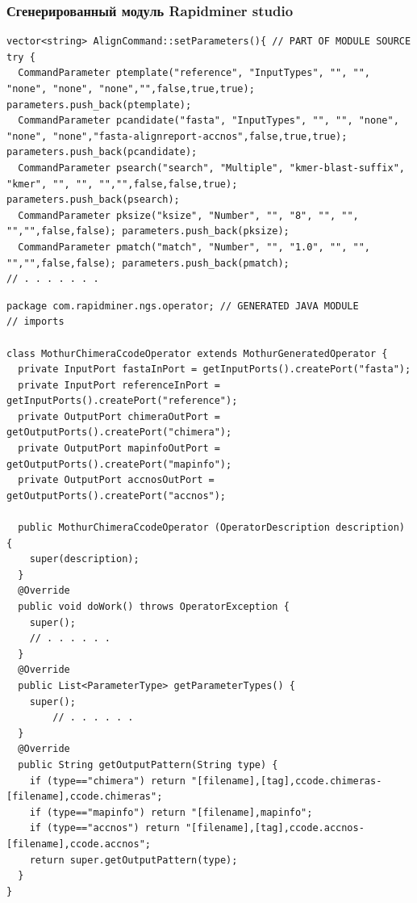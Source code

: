 \documentclass[10pt]{beamer}
\begin{document}
\begin{frame}[fragile]
  \frametitle{Сгенерированный модуль Rapidminer studio}
\begin{verbatim}
vector<string> AlignCommand::setParameters(){ // PART OF MODULE SOURCE
try {
  CommandParameter ptemplate("reference", "InputTypes", "", "", "none", "none", "none","",false,true,true); parameters.push_back(ptemplate);
  CommandParameter pcandidate("fasta", "InputTypes", "", "", "none", "none", "none","fasta-alignreport-accnos",false,true,true); parameters.push_back(pcandidate);
  CommandParameter psearch("search", "Multiple", "kmer-blast-suffix", "kmer", "", "", "","",false,false,true); parameters.push_back(psearch);
  CommandParameter pksize("ksize", "Number", "", "8", "", "", "","",false,false); parameters.push_back(pksize);
  CommandParameter pmatch("match", "Number", "", "1.0", "", "", "","",false,false); parameters.push_back(pmatch);
// . . . . . . .
\end{verbatim}
\begin{verbatim}
package com.rapidminer.ngs.operator; // GENERATED JAVA MODULE
// imports

class MothurChimeraCcodeOperator extends MothurGeneratedOperator {
  private InputPort fastaInPort = getInputPorts().createPort("fasta");
  private InputPort referenceInPort = getInputPorts().createPort("reference");
  private OutputPort chimeraOutPort = getOutputPorts().createPort("chimera");
  private OutputPort mapinfoOutPort = getOutputPorts().createPort("mapinfo");
  private OutputPort accnosOutPort = getOutputPorts().createPort("accnos");

  public MothurChimeraCcodeOperator (OperatorDescription description) {
    super(description);
  }
  @Override
  public void doWork() throws OperatorException {
    super();
    // . . . . . .
  }
  @Override
  public List<ParameterType> getParameterTypes() {
    super();
        // . . . . . .
  }
  @Override
  public String getOutputPattern(String type) {
    if (type=="chimera") return "[filename],[tag],ccode.chimeras-[filename],ccode.chimeras";
    if (type=="mapinfo") return "[filename],mapinfo";
    if (type=="accnos") return "[filename],[tag],ccode.accnos-[filename],ccode.accnos";
    return super.getOutputPattern(type);
  }
}
\end{verbatim}
\end{frame}
\end{document}
